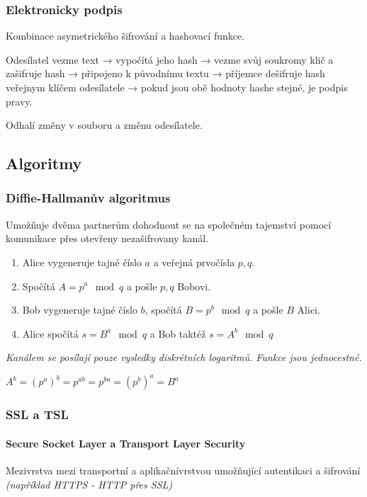 \documentclass[10pt,a4paper]{article}
\begin{document}
\subsubsection{Elektronicky podpis}

Kombinace asymetrického šifrování a hashovací funkce.

Odesílatel vezme text → vypočítá jeho hash → vezme svůj soukromy klič a zašifruje hash → připojeno k původnímu textu → příjemce dešifruje hash veřejnym klíčem odesílatele  → pokud jsou obě hodnoty hashe stejné, je podpis pravy.

Odhalí změny v souboru a změnu odesílatele.

\subsection{Algoritmy}

\subsubsection{Diffie-Hallmanův algoritmus}

Umožňuje dvěma partnerům dohodnout se na společném tajemství pomocí komunikace přes otevřeny nezašifrovany kanál.

\begin{enumerate}
    \item Alice vygeneruje tajné číslo $a$ a veřejná prvočísla $p,q$.
    \item Spočítá $A = p^a \mod q$ a pošle $p,q$ Bobovi.
    \item Bob vygeneruje tajné číslo $b$, spočítá $B = p^b \mod q$ a pošle $B$ Alici.
    \item Alice spočítá $s = B^a \mod q$ a Bob taktéž $s = A^b \mod q$
\end{enumerate}

\textit{Kanálem se posílají pouze vysledky diskrétních logaritmů. Funkce jsou jednocestné.}

$A^b = (p^a)^b = p^{ab} = p^{ba} = (p^b)^a = B^a$

\subsubsection{SSL a TSL}

\paragraph{Secure Socket Layer a Transport Layer Security} Mezivrstva mezi transportní a aplikačnívrstvou umožňující autentikaci a šifrování \textit{(například HTTPS - HTTP přes SSL)}
\end{document}
